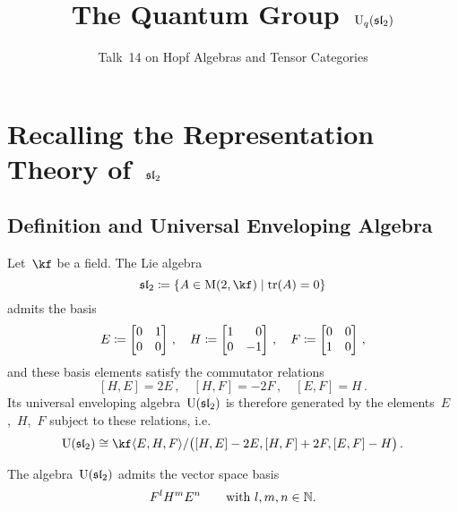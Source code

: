 \documentclass[a4paper, 11pt, oneside]{scrartcl}
\title{The Quantum Group~$\operatorname{U}_q(\mathfrak{sl}_2)$}
\subtitle{Talk~14 on Hopf Algebras and Tensor Categories}
\author{}
\date{}
\begin{document}
\maketitle

\vspace{-4em}





\section{Recalling the Representation Theory of~$\mathfrak{sl}_2$}



\subsection{Definition and Universal Enveloping Algebra}

Let~$\kf$ be a field.
The Lie algebra
\[
  \sllie_2
  \defined
  \{
    A \in \Mat(2, \kf)
  \suchthat
    \tr(A) = 0
  \}
\]
admits the basis
\[
  E
  \defined
  \begin{bmatrix}
    0 & 1 \\
    0 & 0
  \end{bmatrix} \,,
  \quad
  H
  \defined
  \begin{bmatrix*}[r]
    1 &  0 \\
    0 & -1
  \end{bmatrix*} \,,
  \quad
  F
  \defined
  \begin{bmatrix}
    0 & 0 \\
    1 & 0
  \end{bmatrix} \,,
\]
and these basis elements satisfy the commutator relations
\[
  [H, E] = 2E \,,
  \quad
  [H, F] = -2F \,,
  \quad
  [E, F] = H \,.
\]
Its universal enveloping algebra~$\operatorname{U}(\mathfrak{sl}_2)$ is therefore generated by the elements~$E$,~$H$,~$F$ subject to these relations, i.e.
\[
  \Univ(\sllie_2)
  \cong
  \kf\gen{E, H, F}
  /
  \genideal[\big]{[H,E] - 2E, [H,F] + 2F, [E,F] - H} \,.
\]

\begin{theorem}
  The algebra~$\operatorname{U}(\mathfrak{sl}_2)$ admits the vector space basis
  \[
    F^l H^m E^n
    \qquad
    \text{with~$l, m, n \in \mathbb{N}$.}
  \]
\end{theorem}
\end{document}
